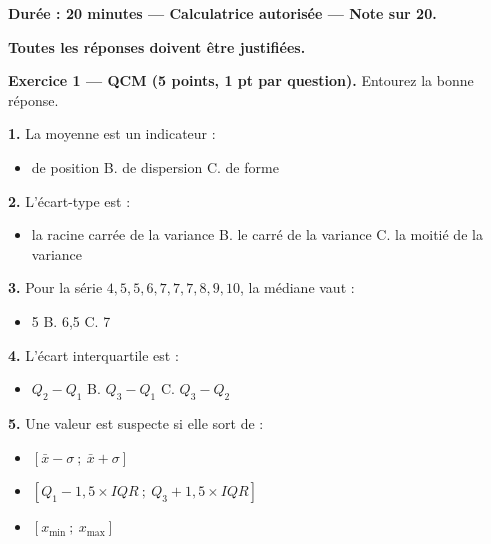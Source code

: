\documentclass[11pt,a4paper]{article}
\begin{document}
\begin{sommative}[title={\textbf{Évaluation sommative 1 — Version A (20 minutes)}}]
\textbf{Durée : 20 minutes — Calculatrice autorisée — Note sur 20.}

\vspace{0.2cm}
\textbf{Toutes les réponses doivent être justifiées.}

\vspace{0.4cm}
\textbf{Exercice 1 — QCM (5 points, 1 pt par question).} Entourez la bonne réponse.

\vspace{0.3cm}
\textbf{1.} La moyenne est un indicateur :
\begin{itemize}[leftmargin=1.2cm, itemsep=1pt]
    \item[A.] de position \hspace{2cm} B. de dispersion \hspace{2cm} C. de forme
\end{itemize}

\textbf{2.} L'écart-type est :
\begin{itemize}[leftmargin=1.2cm, itemsep=1pt]
    \item[A.] la racine carrée de la variance \hspace{2cm} B. le carré de la variance \hspace{2cm} C. la moitié de la variance
\end{itemize}

\textbf{3.} Pour la série \(4, 5, 5, 6, 7, 7, 7, 8, 9, 10\), la médiane vaut :
\begin{itemize}[leftmargin=1.2cm, itemsep=1pt]
    \item[A.] 5 \hspace{2cm} B. 6,5 \hspace{2cm} C. 7
\end{itemize}

\textbf{4.} L'écart interquartile est :
\begin{itemize}[leftmargin=1.2cm, itemsep=1pt]
    \item[A.] \(Q_2 - Q_1\) \hspace{2cm} B. \(Q_3 - Q_1\) \hspace{2cm} C. \(Q_3 - Q_2\)
\end{itemize}

\textbf{5.} Une valeur est suspecte si elle sort de :
\begin{itemize}[leftmargin=1.2cm, itemsep=1pt]
    \item[A.] \([\bar{x} - \sigma\ ;\ \bar{x} + \sigma]\)
    \item[B.] \([Q_1 - 1{,}5 \times IQR\ ;\ Q_3 + 1{,}5 \times IQR]\)
    \item[C.] \([x_{\min}\ ;\ x_{\max}]\)
\end{itemize}


\end{sommative}
\end{document}
